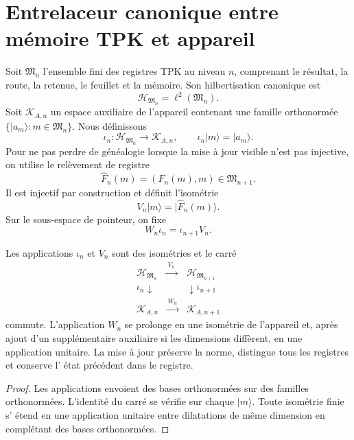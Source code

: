 \section{Entrelaceur canonique entre mémoire TPK et appareil}
\label{sec:hmtf2-aparato-memoria}

Soit \(\mathfrak M_n\) l'ensemble fini des registres TPK au niveau \(n\),
comprenant le résultat, la route, la retenue, le feuillet et la mémoire. Son hilbertisation
canonique est
\[
 \mathcal H_{\mathfrak M_n}
 =\ell^2(\mathfrak M_n).
\]
Soit \(\mathcal K_{A,n}\) un espace auxiliaire de l'appareil contenant une
famille orthonormée
\(\{|a_m\rangle:m\in\mathfrak M_n\}\). Nous définissons
\[
 \iota_n:\mathcal H_{\mathfrak M_n}\longrightarrow\mathcal K_{A,n},
 \qquad
 \iota_n|m\rangle=|a_m\rangle.
\]
Pour ne pas perdre de généalogie lorsque la mise à jour visible n'est pas injective,
on utilise le relèvement de registre
\[
 \widehat F_n(m)=(F_n(m),m)\in\mathfrak M_{n+1}.
\]
Il est injectif par construction et définit l'isométrie
\[
 V_n|m\rangle=|\widehat F_n(m)\rangle.
\]
Sur le sous-espace de pointeur, on fixe
\[
 W_n\iota_n=\iota_{n+1}V_n.
\]

\begin{theorem}
\label{thm:hmtf2-entrelazador-memoria}
Les applications \(\iota_n\) et \(V_n\) sont des isométries et le carré
\[
 \begin{array}{ccc}
 \mathcal H_{\mathfrak M_n}&\xrightarrow{\ V_n\ }&
 \mathcal H_{\mathfrak M_{n+1}}\\
 {\scriptstyle\iota_n}\downarrow&&\downarrow{\scriptstyle\iota_{n+1}}\\
 \mathcal K_{A,n}&\xrightarrow{\ W_n\ }&
 \mathcal K_{A,n+1}
 \end{array}
\]
commute. L'application \(W_n\) se prolonge en une isométrie de l'appareil et, après
ajout d'un supplémentaire auxiliaire si les dimensions diffèrent, en une application unitaire.
La mise à jour préserve la norme, distingue tous les registres et conserve l'
état précédent dans le registre.
\end{theorem}

\begin{proof}
Les applications envoient des bases orthonormées sur des familles orthonormées. L'identité
du carré se vérifie sur chaque \(|m\rangle\). Toute isométrie finie s'
étend en une application unitaire entre dilatations de même dimension en complétant des
bases orthonormées.
\end{proof}


